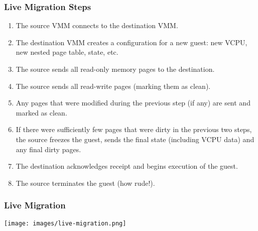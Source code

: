 \begin{frame}
\frametitle{Live Migration Steps}

\begin{enumerate}
	\item The source VMM connects to the destination VMM.
	\item The destination VMM creates a configuration for a new guest: new VCPU, new nested page table, state, etc.
	\item The source sends all read-only memory pages to the destination.
	\item The source sends all read-write pages (marking them as clean).
	\item Any pages that were modified during the previous step (if any) are sent and marked as clean. 
	\item If there were sufficiently few pages that were dirty in the previous two steps, the source freezes the guest, sends the final state (including VCPU data) and any final dirty pages.
	\item The destination acknowledges receipt and begins execution of the guest.
	\item The source terminates the guest (how rude!).
\end{enumerate}

\end{frame}

\begin{frame}
\frametitle{Live Migration}

\begin{center}
	\texttt{[image: images/live-migration.png]}
\end{center}

\end{frame}



